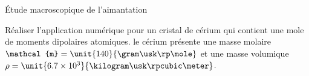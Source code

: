 \begin{td}{Étude macroscopique de l'aimantation}
\begin{exlist}
	  \item Réaliser l'application numérique pour un cristal de cérium qui contient
	    une mole de moments dipolaires atomiques. le cérium présente une masse molaire
	    $\mathcal{m} = \unit{140}{\gram \usk \rp \mole}$ et une masse volumique
    $\rho = \unit{6.7 \times 10^3}{\kilogram \usk \rpcubic \meter}$.
	\end{exlist}
\end{td}
